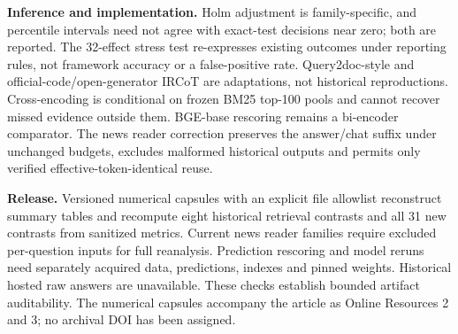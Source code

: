 \textbf{Inference and implementation.} Holm adjustment is family-specific, and percentile intervals need not agree with exact-test decisions near zero; both are reported. The 32-effect stress test re-expresses existing outcomes under reporting rules, not framework accuracy or a false-positive rate. Query2doc-style and official-code/open-generator IRCoT are adaptations, not historical reproductions. Cross-encoding is conditional on frozen BM25 top-100 pools and cannot recover missed evidence outside them. BGE-base rescoring remains a bi-encoder comparator. The news reader correction preserves the answer/chat suffix under unchanged budgets, excludes malformed historical outputs and permits only verified effective-token-identical reuse.

\textbf{Release.} Versioned numerical capsules with an explicit file allowlist reconstruct summary tables and recompute eight historical retrieval contrasts and all 31 new contrasts from sanitized metrics. Current news reader families require excluded per-question inputs for full reanalysis. Prediction rescoring and model reruns need separately acquired data, predictions, indexes and pinned weights. Historical hosted raw answers are unavailable. These checks establish bounded artifact auditability. The numerical capsules accompany the article as Online Resources 2 and 3; no archival DOI has been assigned.
